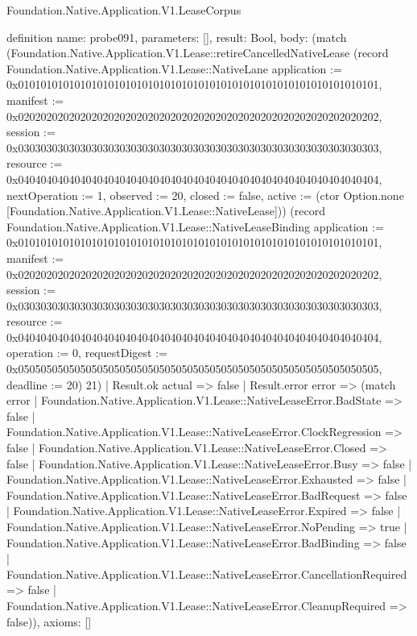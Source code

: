 \begin{lexlean}{Foundation.Native.Application.V1.LeaseCorpus}
\begin{semanticmodule}
definition{
  name: probe091,
  parameters: [],
  result: Bool,
  body: (match (Foundation.Native.Application.V1.Lease::retireCancelledNativeLease (record Foundation.Native.Application.V1.Lease::NativeLane {application := 0x0101010101010101010101010101010101010101010101010101010101010101, manifest := 0x0202020202020202020202020202020202020202020202020202020202020202, session := 0x0303030303030303030303030303030303030303030303030303030303030303, resource := 0x0404040404040404040404040404040404040404040404040404040404040404, nextOperation := 1, observed := 20, closed := false, active := (ctor Option.none [Foundation.Native.Application.V1.Lease::NativeLease])}) (record Foundation.Native.Application.V1.Lease::NativeLeaseBinding {application := 0x0101010101010101010101010101010101010101010101010101010101010101, manifest := 0x0202020202020202020202020202020202020202020202020202020202020202, session := 0x0303030303030303030303030303030303030303030303030303030303030303, resource := 0x0404040404040404040404040404040404040404040404040404040404040404, operation := 0, requestDigest := 0x0505050505050505050505050505050505050505050505050505050505050505, deadline := 20}) 21)
    | Result.ok actual => false
    | Result.error error => (match error
      | Foundation.Native.Application.V1.Lease::NativeLeaseError.BadState => false
      | Foundation.Native.Application.V1.Lease::NativeLeaseError.ClockRegression => false
      | Foundation.Native.Application.V1.Lease::NativeLeaseError.Closed => false
      | Foundation.Native.Application.V1.Lease::NativeLeaseError.Busy => false
      | Foundation.Native.Application.V1.Lease::NativeLeaseError.Exhausted => false
      | Foundation.Native.Application.V1.Lease::NativeLeaseError.BadRequest => false
      | Foundation.Native.Application.V1.Lease::NativeLeaseError.Expired => false
      | Foundation.Native.Application.V1.Lease::NativeLeaseError.NoPending => true
      | Foundation.Native.Application.V1.Lease::NativeLeaseError.BadBinding => false
      | Foundation.Native.Application.V1.Lease::NativeLeaseError.CancellationRequired => false
      | Foundation.Native.Application.V1.Lease::NativeLeaseError.CleanupRequired => false)),
  axioms: []
}


\end{semanticmodule}
\end{lexlean}
